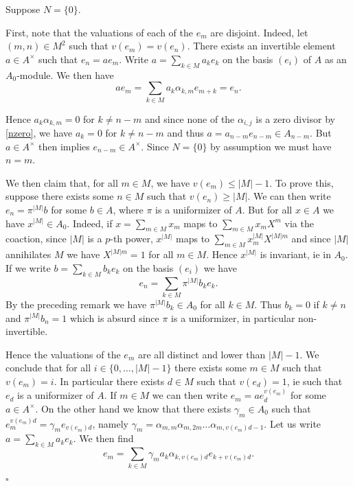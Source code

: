 \documentclass{amsart}
\newenvironment{demo}{{\flushleft \bf Proof~:}}{\hfill $\square$ \vspace{5mm}}
\theoremstyle{definition}
\theoremstyle{remark}
\begin{document}
\begin{demo}
Suppose $N = \{0\}$.

First, note that the valuations of each of the $e_m$ are disjoint. Indeed, let $(m,n) \in M^2$ such that $v(e_m)=v(e_n)$. There exists an invertible element $a \in A^\times$ such that $e_n=ae_m$. Write $a = \displaystyle\sum_{k \in M} a_ke_k$ on the basis $(e_i)$ of $A$ as an $A_0$-module. We then have \[ ae_m =\displaystyle\sum_{k \in M} a_k \alpha_{k,m} e_{m+k} = e_n. \]

Hence $a_k \alpha_{k,m} = 0$ for $k \neq n-m$ and since none of the $\alpha_{i,j}$ is a zero divisor by \ref{nzero}, we have $a_k = 0$ for $k \neq n-m$ and thus $a = a_{n-m}e_{n-m} \in A_{n-m}$. But $a \in A^\times$ then implies $e_{n-m} \in A^\times$. Since $N = \{ 0 \}$ by assumption we must have $n=m$.

We then claim that, for all $m \in M$, we have $v(e_m) \leq \vert M \vert -1$. To prove this, suppose there exists some $n \in M$ such that $v(e_n) \geq \vert M \vert$. We can then write $e_n = \pi^{ \vert M \vert} b$ for some $b \in A$, where $\pi$ is a uniformizer of $A$. But for all $x \in A$ we have $x^{ \vert M \vert} \in A_0$. Indeed, if $x = \displaystyle\sum_{m \in M} x_m$ maps to $\displaystyle\sum_{m \in M} x_m X^m $ via the coaction, since $\vert M \vert$ is a $p$-th power, $x^{\vert M \vert}$ maps to  $\displaystyle\sum_{m \in M} x_m^{\vert M \vert} X^{\vert M \vert m}$ and since $\vert M \vert$ annihilates $M$ we have $X^{\vert M \vert m}=1$ for all $m \in M$. Hence $x^{\vert M \vert}$ is invariant, ie in $A_0$. 
If we write $b = \displaystyle\sum_{k \in M}b_ke_k$ on the basis $(e_i)$ we have \[ e_n = \displaystyle\sum_{k \in M} \pi^{\vert M \vert} b_ke_k. \] By the preceding remark we have $\pi^{\vert M \vert} b_k \in A_0$ for all $k \in M$. Thus $b_k =0$ if $k \neq n$ and $\pi^{ \vert M \vert }b_n = 1$ which is absurd since $\pi$ is a uniformizer, in particular non-invertible. 

Hence the valuations of the $e_m$ are all distinct and lower than $\vert M \vert -1$. We conclude that for all $i \in \{0,..., \vert M \vert -1 \}$ there exists some $m \in M$ such that $v(e_m) = i$. In particular there exists $d \in M$ such that $v(e_d)=1$, ie such that $e_d$ is a uniformizer of $A$. If $m \in M$ we can then write $e_m = a e_d^{v(e_m)}$ for some $a \in A^\times$. On the other hand we know that there exists $\gamma_m \in A_0$ such that $e_m^{v(e_m)d} = \gamma_m e_{v(e_m)d}$, namely $\gamma_m = \alpha_{m,m}\alpha_{m,2m}\dots \alpha_{m,v(e_m)d-1}$. Let us write $a = \displaystyle\sum_{k \in M} a_k e_k$. We then find \[ e_m = \displaystyle\sum_{k \in M} \gamma_m a_k \alpha_{k,v(e_m)d} e_{k +v(e_m)d}. \]


\end{demo}
\end{document}
